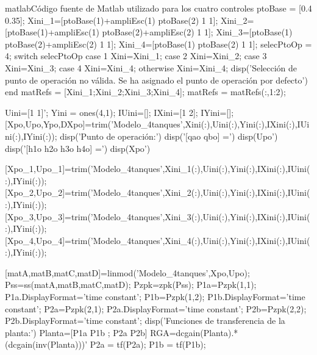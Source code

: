 \begin{anexo}
\begin{sourcecode}{matlab}{Código fuente de Matlab utilizado para los cuatro controles}
ptoBase = [0.4 0.35];
Xini_1=[ptoBase(1)+ampliEsc(1) ptoBase(2) 1 1]; %
Xini_2=[ptoBase(1)+ampliEsc(1) ptoBase(2)+ampliEsc(2) 1 1]; %
Xini_3=[ptoBase(1) ptoBase(2)+ampliEsc(2) 1 1];%
Xini_4=[ptoBase(1) ptoBase(2) 1 1];%
selecPtoOp = 4;
switch selecPtoOp
    case 1
        Xini=Xini_1;
    case 2
        Xini=Xini_2;
    case 3
        Xini=Xini_3;
    case 4
        Xini=Xini_4;
    otherwise
        Xini=Xini_4;
        disp('Selección de punto de operación no válida. Se ha asignado el punto de operación por defecto')
end
matRefs = [Xini_1;Xini_2;Xini_3;Xini_4];
matRefs = matRefs(:,1:2);


Uini=[1 1]';
Yini = ones(4,1);
IUini=[];
IXini=[1 2];
IYini=[];
[Xpo,Upo,Ypo,DXpo]=trim('Modelo_4tanques',Xini(:),Uini(:),Yini(:),IXini(:),IUini(:),IYini(:));
disp('Punto de operación:')
disp('[qao qbo] =')
disp(Upo')
disp('[h1o h2o h3o h4o] =')
disp(Xpo')

[Xpo_1,Upo_1]=trim('Modelo_4tanques',Xini_1(:),Uini(:),Yini(:),IXini(:),IUini(:),IYini(:));
[Xpo_2,Upo_2]=trim('Modelo_4tanques',Xini_2(:),Uini(:),Yini(:),IXini(:),IUini(:),IYini(:));
[Xpo_3,Upo_3]=trim('Modelo_4tanques',Xini_3(:),Uini(:),Yini(:),IXini(:),IUini(:),IYini(:));
[Xpo_4,Upo_4]=trim('Modelo_4tanques',Xini_4(:),Uini(:),Yini(:),IXini(:),IUini(:),IYini(:));


[matA,matB,matC,matD]=linmod('Modelo_4tanques',Xpo,Upo);
Pss=ss(matA,matB,matC,matD);
Pzpk=zpk(Pss);
P1a=Pzpk(1,1);
P1a.DisplayFormat='time constant';
P1b=Pzpk(1,2);
P1b.DisplayFormat='time constant';
P2a=Pzpk(2,1);
P2a.DisplayFormat='time constant';
P2b=Pzpk(2,2);
P2b.DisplayFormat='time constant';
disp('Funciones de transferencia de la planta:')
Planta=[P1a P1b ; P2a P2b]
RGA=dcgain(Planta).*(dcgain(inv(Planta)))'
P2a = tf(P2a);
P1b = tf(P1b);


\end{sourcecode}
\end{anexo}
